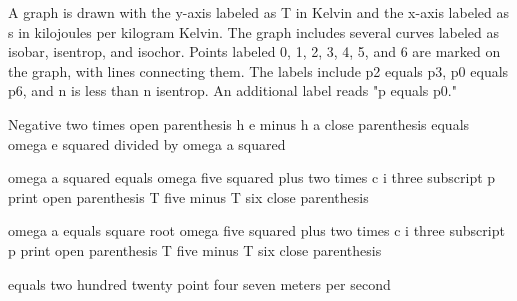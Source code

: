 A graph is drawn with the y-axis labeled as T in Kelvin and the x-axis labeled as s in kilojoules per kilogram Kelvin. The graph includes several curves labeled as isobar, isentrop, and isochor. Points labeled 0, 1, 2, 3, 4, 5, and 6 are marked on the graph, with lines connecting them. The labels include p2 equals p3, p0 equals p6, and n is less than n isentrop. An additional label reads "p equals p0."

Negative two times open parenthesis h e minus h a close parenthesis equals omega e squared divided by omega a squared

omega a squared equals omega five squared plus two times c i three subscript p print open parenthesis T five minus T six close parenthesis

omega a equals square root omega five squared plus two times c i three subscript p print open parenthesis T five minus T six close parenthesis

equals two hundred twenty point four seven meters per second